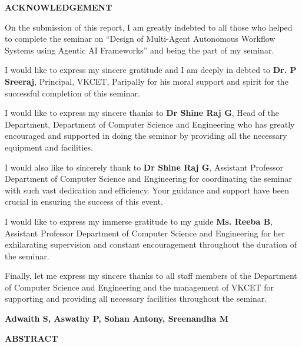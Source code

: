 \documentclass[12pt,letterpaper]{article}
\newcommand{\frontmattertitle}[1]{%
  \begin{center}
    {\fontsize{13.2pt}{16pt}\selectfont\bfseries #1\par}%
  \end{center}%
  \vspace{10pt}%
}
\newcommand{\bodytextstyle}{\fontsize{11.3pt}{25.8pt}\selectfont}
\begin{document}
\setcounter{page}{1}
\frontmattertitle{ACKNOWLEDGEMENT}
\vspace{6pt}

\bodytextstyle
On the submission of this report, I am greatly indebted to all those who helped to complete the seminar on ``Design of Multi-Agent Autonomous Workflow Systems using Agentic AI Frameworks'' and being the part of my seminar.

I would like to express my sincere gratitude and I am deeply in debted to \textbf{Dr. P Sreeraj}, Principal, VKCET, Paripally for his moral support and spirit for the successful completion of this seminar.

I would like to express my sincere thanks to \textbf{Dr Shine Raj G}, Head of the Department, Department of Computer Science and Engineering who has greatly encouraged and supported in doing the seminar by providing all the necessary equipment and facilities.

I would also like to sincerely thank to \textbf{Dr Shine Raj G}, Assistant Professor Department of Computer Science and Engineering for coordinating the seminar with such vast dedication and efficiency. Your guidance and support have been crucial in ensuring the success of this event.

I would like to express my immerse gratitude to my guide \textbf{Ms. Reeba B}, Assistant Professor Department of Computer Science and Engineering for her exhilarating supervision and constant encouragement throughout the duration of the seminar.

Finally, let me express my sincere thanks to all staff members of the Department of Computer Science and Engineering and the management of VKCET for supporting and providing all necessary facilities throughout the seminar.

\vspace{12pt}
\hfill {\bfseries Adwaith S, Aswathy P, Sohan Antony, Sreenandha M}
\newpage

\frontmattertitle{ABSTRACT}
\vspace{6pt}
\end{document}
